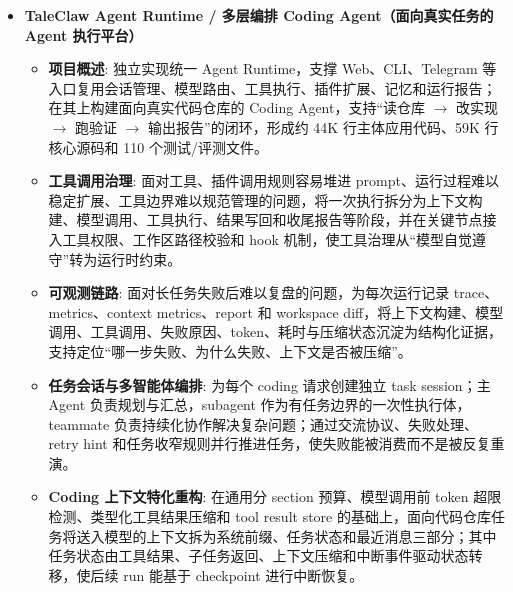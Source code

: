 \documentclass[zh]{resume}
\begin{document}
\begin{itemize}
\item \textbf{TaleClaw Agent Runtime / 多层编排 Coding Agent（面向真实任务的 Agent 执行平台）}
\begin{itemize}
\item \textbf{项目概述}: 独立实现统一 Agent Runtime，支撑 Web、CLI、Telegram 等入口复用会话管理、模型路由、工具执行、插件扩展、记忆和运行报告；在其上构建面向真实代码仓库的 Coding Agent，支持“读仓库 $\rightarrow$ 改实现 $\rightarrow$ 跑验证 $\rightarrow$ 输出报告”的闭环，形成约 44K 行主体应用代码、59K 行核心源码和 110 个测试/评测文件。
\item \textbf{工具调用治理}: 面对工具、插件调用规则容易堆进 prompt、运行过程难以稳定扩展、工具边界难以规范管理的问题，将一次执行拆分为上下文构建、模型调用、工具执行、结果写回和收尾报告等阶段，并在关键节点接入工具权限、工作区路径校验和 hook 机制，使工具治理从“模型自觉遵守”转为运行时约束。
\item \textbf{可观测链路}: 面对长任务失败后难以复盘的问题，为每次运行记录 trace、metrics、context metrics、report 和 workspace diff，将上下文构建、模型调用、工具调用、失败原因、token、耗时与压缩状态沉淀为结构化证据，支持定位“哪一步失败、为什么失败、上下文是否被压缩”。
\item \textbf{任务会话与多智能体编排}: 为每个 coding 请求创建独立 task session；主 Agent 负责规划与汇总，subagent 作为有任务边界的一次性执行体，teammate 负责持续化协作解决复杂问题；通过交流协议、失败处理、retry hint 和任务收窄规则并行推进任务，使失败能被消费而不是被反复重演。
\item \textbf{Coding 上下文特化重构}: 在通用分 section 预算、模型调用前 token 超限检测、类型化工具结果压缩和 tool result store 的基础上，面向代码仓库任务将送入模型的上下文拆为系统前缀、任务状态和最近消息三部分；其中任务状态由工具结果、子任务返回、上下文压缩和中断事件驱动状态转移，使后续 run 能基于 checkpoint 进行中断恢复。
\end{itemize}


\end{itemize}
\end{document}
